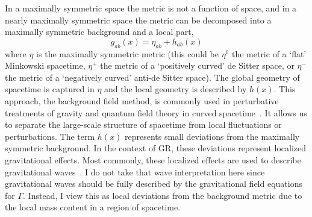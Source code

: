 \documentclass[aps,prd,preprint]{revtex4-1}
\begin{document}
In a maximally symmetric space the metric is not a function of space, and in a nearly maximally symmetric space the metric can be decomposed into a maximally symmetric background and a local part,
\begin{equation}\label{metric_decomp}
    g_{ab}(x) = \eta_{ab} + h_{ab}(x)
\end{equation}
where $\eta$ is the maximally symmetric metric (this could be $\eta^0$ the metric of a `flat' Minkowski spacetime, $\eta^+$ the metric of a `positively curved' de Sitter space, or $\eta^-$ the metric of a `negatively curved' anti-de Sitter space). The global geometry of spacetime is captured in $\eta$ and the local geometry is described by $h(x)$. This approach, the background field method, is commonly used in perturbative treatments of gravity and quantum field theory in curved spacetime~\cite{hollands_2002,bern_2002}. It allows us to separate the large-scale structure of spacetime from local fluctuations or perturbations. The term $h(x)$ represents small deviations from the maximally symmetric background. In the context of GR, these deviations represent localized gravitational effects. Most commonly, these localized effects are used to describe gravitational waves~\cite{Einstein_1937}. I do not take that wave interpretation here since gravitational waves should be fully described by the gravitational field equations for $\Gamma$. Instead, I view this as local deviations from the background metric due to the local mass content in a region of spacetime.
\end{document}
